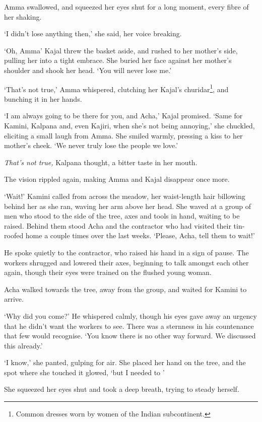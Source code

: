 Amma swallowed, and squeezed her eyes shut for a long moment, every
fibre of her shaking.

`I didn't lose anything then,' she said, her voice breaking.

`Oh, Amma\textellipsis' Kajal threw the basket aside, and rushed to her mother's
side, pulling her into a tight embrace. She buried her face against
her mother's shoulder and shook her head. `You will never lose me.'

`That's not true,' Amma whispered, clutching her Kajal's
churidar\footnote{Common dresses worn by women of the Indian
  subcontinent.}, and bunching it in her hands.

`I am always going to be there for you, and Acha,' Kajal
promised. `Same for Kamini, Kalpana and, even Kajiri, when she's not
being annoying,' she chuckled, eliciting a small laugh from Amma. She
smiled warmly, pressing a kiss to her mother's cheek. `We never truly
lose the people we love.'

\emph{That's not true,} Kalpana thought, a bitter taste in her mouth.

The vision rippled again, making Amma and Kajal disappear once more.

`Wait!' Kamini called from across the meadow, her waist-length hair
billowing behind her as she ran, waving her arm above her head. She
waved at a group of men who stood to the side of the tree, axes and
tools in hand, waiting to be raised. Behind them stood Acha and the
contractor who had visited their tin-roofed home a couple times over
the last weeks. `Please, Acha, tell them to wait!'

He spoke quietly to the contractor, who raised his hand in a sign of
pause. The workers shrugged and lowered their axes, beginning to talk
amongst each other again, though their eyes were trained on the
flushed young woman.

Acha walked towards the tree, away from the group, and waited for
Kamini to arrive.

`Why did you come?' He whispered calmly, though his eyes gave away an
urgency that he didn't want the workers to see. There was a sternness
in his countenance that few would recognise. `You know there is no
other way forward. We discussed this already.'

`I know,' she panted, gulping for air. She placed her hand on the
tree, and the spot where she touched it glowed, `but I needed to
\textemdash{}'

She squeezed her eyes shut and took a deep breath, trying to steady herself.

